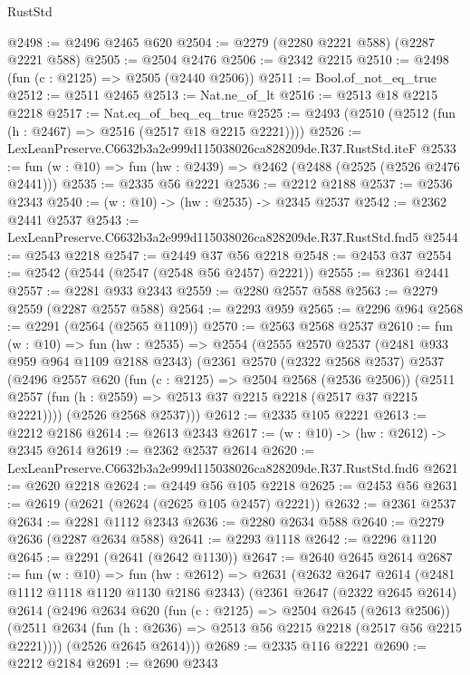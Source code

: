 \begin{lexlean}{RustStd}
\begin{coremodule}
@2498 := @2496 @2465 @620
@2504 := @2279 (@2280 @2221 @588) (@2287 @2221 @588)
@2505 := @2504 @2476
@2506 := @2342 @2215
@2510 := @2498 (fun (c : @2125) => @2505 (@2440 @2506))
@2511 := Bool.of_not_eq_true
@2512 := @2511 @2465
@2513 := Nat.ne_of_lt
@2516 := @2513 @18 @2215 @2218
@2517 := Nat.eq_of_beq_eq_true
@2525 := @2493 (@2510 (@2512 (fun (h : @2467) => @2516 (@2517 @18 @2215 @2221))))
@2526 := LexLeanPreserve.C6632b3a2e999d115038026ca828209de.R37.RustStd.iteF
@2533 := fun (w : @10) => fun (hw : @2439) => @2462 (@2488 (@2525 (@2526 @2476 @2441)))
@2535 := @2335 @56 @2221
@2536 := @2212 @2188
@2537 := @2536 @2343
@2540 := (w : @10) -> (hw : @2535) -> @2345 @2537
@2542 := @2362 @2441 @2537
@2543 := LexLeanPreserve.C6632b3a2e999d115038026ca828209de.R37.RustStd.fnd5
@2544 := @2543 @2218
@2547 := @2449 @37 @56 @2218
@2548 := @2453 @37
@2554 := @2542 (@2544 (@2547 (@2548 @56 @2457) @2221))
@2555 := @2361 @2441
@2557 := @2281 @933 @2343
@2559 := @2280 @2557 @588
@2563 := @2279 @2559 (@2287 @2557 @588)
@2564 := @2293 @959
@2565 := @2296 @964
@2568 := @2291 (@2564 (@2565 @1109))
@2570 := @2563 @2568 @2537
@2610 := fun (w : @10) =>
  fun (hw : @2535) =>
  @2554
    (@2555
      @2570
      @2537
      (@2481 @933 @959 @964 @1109 @2188 @2343)
      (@2361
        @2570
        (@2322 @2568 @2537)
        @2537
        (@2496
          @2557
          @620
          (fun (c : @2125) => @2504 @2568 (@2536 @2506))
          (@2511 @2557 (fun (h : @2559) => @2513 @37 @2215 @2218 (@2517 @37 @2215 @2221))))
        (@2526 @2568 @2537)))
@2612 := @2335 @105 @2221
@2613 := @2212 @2186
@2614 := @2613 @2343
@2617 := (w : @10) -> (hw : @2612) -> @2345 @2614
@2619 := @2362 @2537 @2614
@2620 := LexLeanPreserve.C6632b3a2e999d115038026ca828209de.R37.RustStd.fnd6
@2621 := @2620 @2218
@2624 := @2449 @56 @105 @2218
@2625 := @2453 @56
@2631 := @2619 (@2621 (@2624 (@2625 @105 @2457) @2221))
@2632 := @2361 @2537
@2634 := @2281 @1112 @2343
@2636 := @2280 @2634 @588
@2640 := @2279 @2636 (@2287 @2634 @588)
@2641 := @2293 @1118
@2642 := @2296 @1120
@2645 := @2291 (@2641 (@2642 @1130))
@2647 := @2640 @2645 @2614
@2687 := fun (w : @10) =>
  fun (hw : @2612) =>
  @2631
    (@2632
      @2647
      @2614
      (@2481 @1112 @1118 @1120 @1130 @2186 @2343)
      (@2361
        @2647
        (@2322 @2645 @2614)
        @2614
        (@2496
          @2634
          @620
          (fun (c : @2125) => @2504 @2645 (@2613 @2506))
          (@2511 @2634 (fun (h : @2636) => @2513 @56 @2215 @2218 (@2517 @56 @2215 @2221))))
        (@2526 @2645 @2614)))
@2689 := @2335 @116 @2221
@2690 := @2212 @2184
@2691 := @2690 @2343

\end{coremodule}
\end{lexlean}
